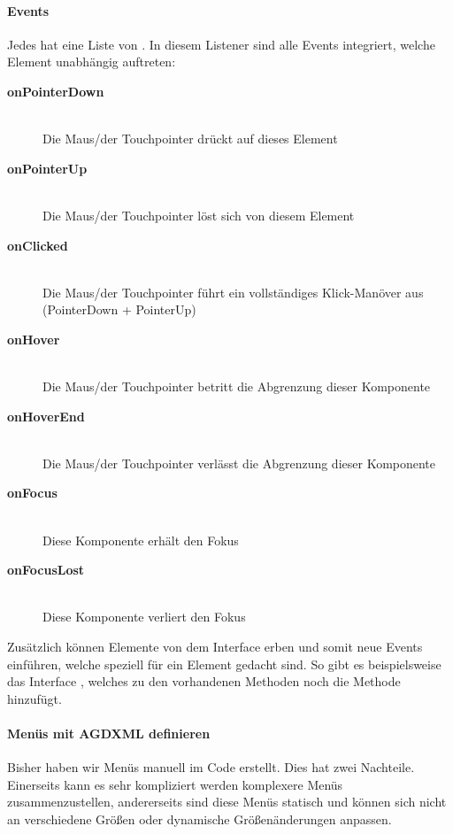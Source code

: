 \paragraph{Events}

Jedes  hat eine Liste von . In diesem Listener sind alle Events integriert, welche Element unabhängig auftreten:

\begin{description}
	\item[\textbf{onPointerDown}] \hfill \\  Die Maus/der Touchpointer drückt auf dieses Element
	\item[\textbf{onPointerUp}]   \hfill \\  Die Maus/der Touchpointer löst sich von diesem Element
	\item[\textbf{onClicked}]     \hfill \\  Die Maus/der Touchpointer führt ein vollständiges Klick-Manöver aus (PointerDown + PointerUp)
	\item[\textbf{onHover}]       \hfill \\  Die Maus/der Touchpointer betritt die Abgrenzung dieser Komponente
	\item[\textbf{onHoverEnd}]    \hfill \\  Die Maus/der Touchpointer verlässt die Abgrenzung dieser Komponente
	\item[\textbf{onFocus}]       \hfill \\  Diese Komponente erhält den Fokus
	\item[\textbf{onFocusLost}]   \hfill \\  Diese Komponente verliert den Fokus
\end{description}

Zusätzlich können Elemente von dem Interface  erben und somit neue Events einführen, welche speziell für ein Element gedacht sind. So gibt es beispielsweise das Interface , welches zu den vorhandenen Methoden noch die Methode  hinzufügt.

\paragraph{Menüs mit AGDXML definieren}

Bisher haben wir Menüs manuell im Code erstellt. Dies hat zwei Nachteile. Einerseits kann es sehr kompliziert werden komplexere Menüs zusammenzustellen, andererseits sind diese Menüs statisch und können sich nicht an verschiedene Größen oder dynamische Größenänderungen anpassen.

